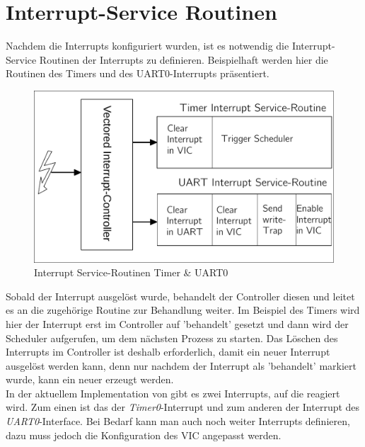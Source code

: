 \section{Interrupt-Service Routinen}
Nachdem die Interrupts konfiguriert wurden, ist es notwendig die Interrupt-Service Routinen der Interrupts zu definieren. Beispielhaft werden hier die Routinen des Timers und des UART0-Interrupts pr\"asentiert.
\begin{figure}[H]
	\begin{center}	
	\caption{Interrupt Service-Routinen Timer \& UART0}
	\includegraphics[scale=0.60]{common/isr.pdf}
	\end{center}
\end{figure}
\noindent
Sobald der Interrupt ausgel\"ost wurde, behandelt der Controller diesen und leitet es an die zugeh\"orige Routine zur Behandlung weiter. Im Beispiel des Timers wird hier der Interrupt erst im Controller auf 'behandelt' gesetzt und dann wird der Scheduler aufgerufen, um dem n\"achsten Prozess zu starten. Das L\"oschen des Interrupts im Controller ist deshalb erforderlich, damit ein neuer Interrupt ausgel\"ost werden kann, denn nur nachdem der Interrupt als 'behandelt' markiert wurde, kann ein neuer erzeugt werden. \\ In der aktuellem Implementation von \mops gibt es zwei Interrupts, auf die reagiert wird. Zum einen ist das der \textit{Timer0}-Interrupt und zum anderen der Interrupt des \textit{UART0}-Interface. Bei Bedarf kann man auch noch weiter Interrupts definieren, dazu muss jedoch die Konfiguration des VIC angepasst werden.
